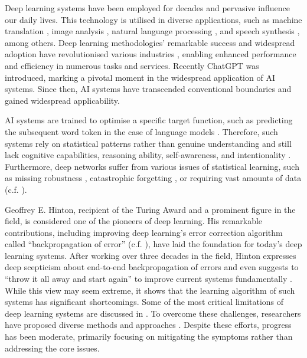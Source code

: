Deep learning systems have been employed for decades \cite{ivakhnenko_cybernetic_1965} and pervasive influence our daily lives. This technology is utilised in diverse applications, such as machine translation \cite{dabre_survey_2021}, image analysis \cite{bhatt_cnn_2021}, natural language processing \cite{otter_survey_2021}, and speech synthesis \cite{ning_review_2019}, among others. Deep learning methodologies' remarkable success and widespread adoption have revolutionised various industries , enabling enhanced performance and efficiency in numerous tasks and services.
Recently ChatGPT  was introduced, marking a pivotal moment in the widespread application of AI systems.
Since then, AI systems have transcended conventional boundaries and gained widespread applicability.

AI systems are trained to optimise a specific target function, such as predicting the subsequent word token in the case of language models .
Therefore, such systems rely on statistical patterns rather than genuine understanding and still lack cognitive capabilities, reasoning ability, self-awareness, and intentionality .
Furthermore, deep networks suffer from various issues of statistical learning, such as missing robustness , catastrophic forgetting , or requiring vast amounts of data  (c.f. ).

Geoffrey E. Hinton, recipient of the Turing Award and a prominent figure in the field, is considered one of the pioneers of deep learning.
His remarkable contributions, including improving deep learning's error correction algorithm called ``backpropagation of error''   (c.f. ), have laid the foundation for today's deep learning systems.
After working over three decades in the field, Hinton expresses deep scepticism about end-to-end backpropagation of errors and even suggests to ``throw it all away and start again'' to improve current systems fundamentally .
While this view may seem extreme, it shows that the learning algorithm of such systems has significant shortcomings.
Some of the most critical limitations of deep learning systems are discussed in .
To overcome these challenges, researchers have proposed diverse methods and approaches \cite{long_survey_2022, sager_unsupervised_2022, yarats_improving_2021}. Despite these efforts, progress has been moderate, primarily focusing on mitigating the symptoms rather than addressing the core issues.

